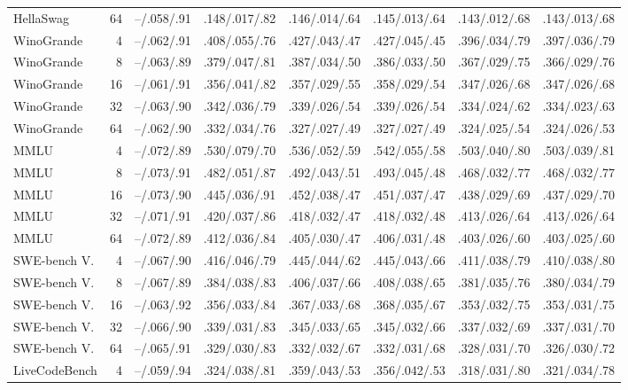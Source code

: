 \begin{table}[p]
\begin{tabular}{@{}lrllllll@{}}
HellaSwag & 64 & --/.058/.91 & .148/.017/.82 & .146/.014/.64 & .145/.013/.64 & .143/.012/.68 & .143/.013/.68 \\
\addlinespace[1pt]
WinoGrande & 4 & --/.062/.91 & .408/.055/.76 & .427/.043/.47 & .427/.045/.45 & .396/.034/.79 & .397/.036/.79 \\
WinoGrande & 8 & --/.063/.89 & .379/.047/.81 & .387/.034/.50 & .386/.033/.50 & .367/.029/.75 & .366/.029/.76 \\
WinoGrande & 16 & --/.061/.91 & .356/.041/.82 & .357/.029/.55 & .358/.029/.54 & .347/.026/.68 & .347/.026/.68 \\
WinoGrande & 32 & --/.063/.90 & .342/.036/.79 & .339/.026/.54 & .339/.026/.54 & .334/.024/.62 & .334/.023/.63 \\
WinoGrande & 64 & --/.062/.90 & .332/.034/.76 & .327/.027/.49 & .327/.027/.49 & .324/.025/.54 & .324/.026/.53 \\
\addlinespace[1pt]
MMLU & 4 & --/.072/.89 & .530/.079/.70 & .536/.052/.59 & .542/.055/.58 & .503/.040/.80 & .503/.039/.81 \\
MMLU & 8 & --/.073/.91 & .482/.051/.87 & .492/.043/.51 & .493/.045/.48 & .468/.032/.77 & .468/.032/.77 \\
MMLU & 16 & --/.073/.90 & .445/.036/.91 & .452/.038/.47 & .451/.037/.47 & .438/.029/.69 & .437/.029/.70 \\
MMLU & 32 & --/.071/.91 & .420/.037/.86 & .418/.032/.47 & .418/.032/.48 & .413/.026/.64 & .413/.026/.64 \\
MMLU & 64 & --/.072/.89 & .412/.036/.84 & .405/.030/.47 & .406/.031/.48 & .403/.026/.60 & .403/.025/.60 \\
\addlinespace[1pt]
SWE-bench V. & 4 & --/.067/.90 & .416/.046/.79 & .445/.044/.62 & .445/.043/.66 & .411/.038/.79 & .410/.038/.80 \\
SWE-bench V. & 8 & --/.067/.89 & .384/.038/.83 & .406/.037/.66 & .408/.038/.65 & .381/.035/.76 & .380/.034/.79 \\
SWE-bench V. & 16 & --/.063/.92 & .356/.033/.84 & .367/.033/.68 & .368/.035/.67 & .353/.032/.75 & .353/.031/.75 \\
SWE-bench V. & 32 & --/.066/.90 & .339/.031/.83 & .345/.033/.65 & .345/.032/.66 & .337/.032/.69 & .337/.031/.70 \\
SWE-bench V. & 64 & --/.065/.91 & .329/.030/.83 & .332/.032/.67 & .332/.031/.68 & .328/.031/.70 & .326/.030/.72 \\
\addlinespace[1pt]
LiveCodeBench & 4 & --/.059/.94 & .324/.038/.81 & .359/.043/.53 & .356/.042/.53 & .318/.031/.80 & .321/.034/.78 \\

\end{tabular}
\end{table}
